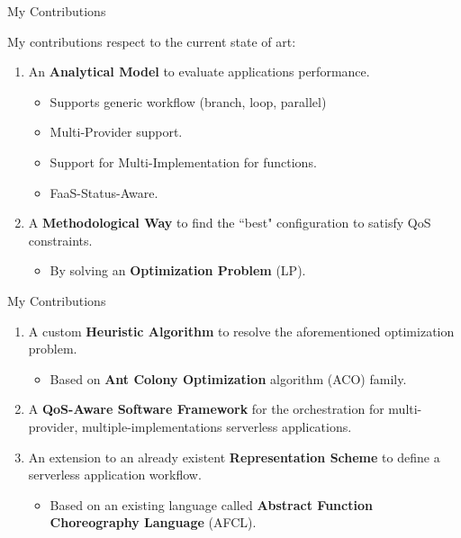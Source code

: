 \documentclass[13.5pt]{beamer}
\newcommand{\B}[1]{\textcolor{TorVergataColor}{\textbf{#1}}}
\begin{document}

\begin{frame}{My Contributions}
	
	My contributions respect to the current state of art:
	\vspace{\baselineskip}
	\begin{enumerate}
	
		\item An \B{Analytical Model} to evaluate applications performance.
		\begin{itemize}
			\item Supports generic workflow (branch, loop, parallel)
			\item Multi-Provider support.
			\item Support for Multi-Implementation for functions.
			\item FaaS-Status-Aware.
		\end{itemize}
		\vspace{\baselineskip} 
		\item A \B{Methodological Way} to find the ``best" configuration to satisfy QoS constraints.
		\begin{itemize}
			\item By solving an \B{Optimization Problem} (LP).
		\end{itemize}
		\vspace{\baselineskip} 
		
	\end{enumerate}
	
\end{frame} 


\begin{frame}{My Contributions}
	
	\vspace{\baselineskip}
	\begin{enumerate}
		\justifying
		\setcounter{enumi}{2}
		\item A custom \B{Heuristic Algorithm} to resolve the aforementioned optimization problem.
		\begin{itemize}
			\item Based on \B{Ant Colony Optimization} algorithm (ACO) family.
		\end{itemize}
		\vspace{\baselineskip} 
		\item A \B{QoS-Aware Software Framework} for the orchestration for multi-provider, multiple-implementations serverless applications. 
		
		\vspace{\baselineskip} 
		\item An extension to an already existent \B{Representation Scheme} to define a serverless application workflow.
		\begin{itemize}
			\item Based on an existing language called \B{Abstract Function Choreography Language} (AFCL).
		\end{itemize}
		
	\end{enumerate}
	
\end{frame} 
\end{document}
